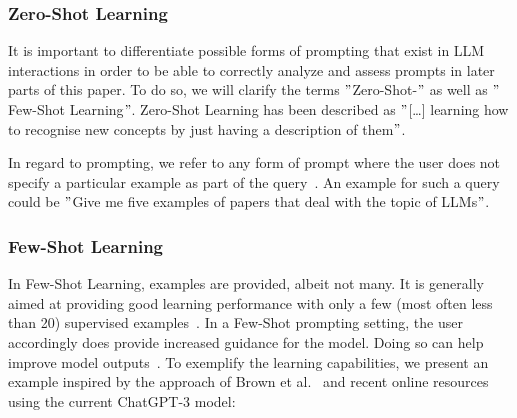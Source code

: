 \subsubsection{Zero-Shot Learning} %
It is important to differentiate possible forms of prompting that exist in LLM interactions in order
to be able to correctly analyze and assess prompts in later parts of this paper.
To do so, we will clarify the terms \("\)Zero-Shot-\("\) as well as \("\)Few-Shot Learning\("\).
Zero-Shot Learning has been described as \("\)[\ldots] learning how to recognise
new concepts by just having a description of them\("\)\cite[p. 1]{feris_embarrassingly_2015}.

In regard to prompting, we refer to any form of prompt where the user does not specify
a particular example as part of the query~\cite[p. 1]{dang_how_2022}.
An example for such a query could be \("\)Give me five examples of papers that deal with the topic
of LLMs\("\).

\subsubsection{Few-Shot Learning}
In Few-Shot Learning, examples are provided, albeit not many.
It is generally aimed at providing good learning performance with only a few (most often less than 20)
supervised examples~\cite[p. 1]{samuel_offline_2022}. %
In a Few-Shot prompting setting, the user accordingly does provide increased guidance for the model.
Doing so can help improve model outputs~\cite[p. 1]{dang_how_2022}.
To exemplify the learning capabilities, we present an example inspired by the approach of Brown et al\(.\)~\cite{brown_language_2020}
and recent online resources~\cite{dairai_few-shot_2023} using the current ChatGPT-3 model:


